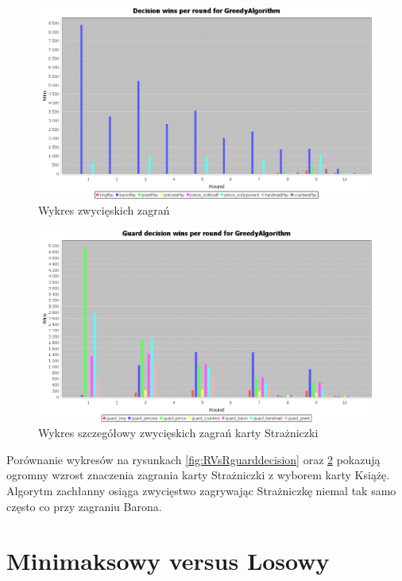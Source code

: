 \clearpage
\begin{figure}[H]
	\centering
	\includegraphics[width=\textwidth]{Resources/GVsR/GVsRdecision.PNG}
	\caption{Wykres zwycięskich zagrań} 
	\label{fig:GVsRdecision}
\end{figure} 

\begin{figure}[H]
	\centering
	\includegraphics[width=\textwidth]{Resources/GVsR/GVsRguarddecision.PNG}
	\caption{Wykres szczegółowy zwycięskich zagrań karty Strażniczki} 
	\label{fig:GVsRguarddecision}
\end{figure}

Porównanie wykresów na rysunkach \ref{fig:RVsRguarddecision} oraz \ref{fig:GVsRguarddecision} pokazują ogromny wzrost znaczenia zagrania karty Strażniczki z wyborem karty Książę. Algorytm zachłanny osiąga zwycięstwo zagrywając Strażniczkę niemal tak samo często co przy zagraniu Barona.

\section{Minimaksowy versus Losowy}

